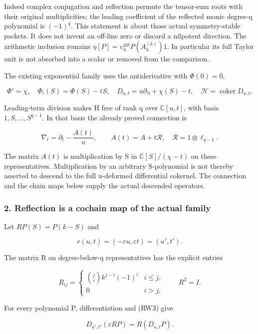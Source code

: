 Indeed complex conjugation and reflection permute the tensor-sum roots with their original multiplicities; the leading coefficient of the reflected monic degree-q polynomial is \((-1)^q\). This statement is about those actual symmetry-stable packets. It does not invent an off-line zero or discard a nilpotent direction. The arithmetic inclusion remains \(\eta[P]=\upsilon_h^{\otimes k}P(A_h^{(k)})1\). In particular its full Taylor unit is not absorbed into a scalar or removed from the comparison.

The existing exponential family uses the antiderivative with \(\Phi(0)=0\),

\[
\Phi'=\chi,\quad\Phi_t(S)=\Phi(S)-tS,\quad
D_{u,t}=u\partial_S+\chi(S)-t,
\quad\mathcal H=\operatorname{coker}D_{u,t}.
\tag{RW4}
\]

Leading-term division makes H free of rank q over \(\mathbb C[u,t]\), with basis \(1,S,\ldots,S^{q-1}\). In that basis the already proved connection is

\[
\nabla_t=\partial_t-\frac{A(t)}u,\qquad
A(t)=A+t\mathcal R,
\quad\mathcal R=1\otimes\ell_{q-1}.
\tag{RW5}
\]

The matrix \(A(t)\) is multiplication by S in \(\mathbb C[S]/(\chi-t)\) on these representatives. Multiplication by an arbitrary S-polynomial is not thereby asserted to descend to the full u-deformed differential cokernel. The connection and the chain maps below supply the actual descended operators.

\subsubsection{2. Reflection is a cochain map of the actual family}\label{endpoint-f1_reflection--reflection-is-a-cochain-map-of-the-actual-family}

Let \(RP(S)=P(k-S)\) and

\[
r(u,t)=(-\varepsilon u,\varepsilon t)=(u',t').
\tag{RW6}
\]

The matrix R on degree-below-q representatives has the explicit entries

\[
R_{ij}=\begin{cases}\binom ji k^{j-i}(-1)^i&i\le j,\\0&i>j,
\end{cases}\qquad R^2=I.
\tag{RW7}
\]

For every polynomial P, differentiation and (RW3) give

\[
D_{u',t'}(\varepsilon RP)=R(D_{u,t}P).
\tag{RW8}
\]

